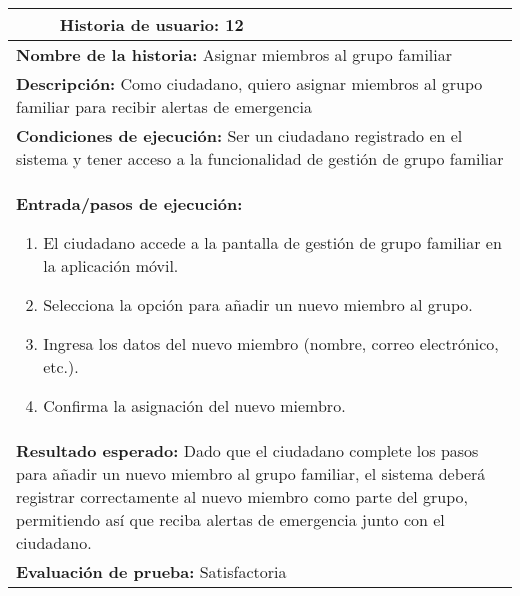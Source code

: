 \begin{longtable}{|p{6.7cm}|p{6.7cm}|}
    \hline
    \endlastfoot
    \multicolumn{1}{|p{6.7cm}|}{\textbf{Número} 12 } & \multicolumn{1}{|p{6.7cm}|}{\textbf{Historia de usuario:} 12}                                                                                                                                                                                              \\
    \hline
    \multicolumn{2}{|p{13.4cm}|}{\textbf{Nombre de la historia:} Asignar miembros al grupo familiar }                                                                                                                                                                                                             \\
    \hline
    \multicolumn{2}{|p{13.4cm}|}{\textbf{Descripción:} Como ciudadano, quiero asignar miembros al grupo familiar para recibir alertas de emergencia}                                                                                                                                                              \\
    \hline
    \multicolumn{2}{|p{13.4cm}|}{\textbf{Condiciones de ejecución:} Ser un ciudadano registrado en el sistema y tener acceso a la funcionalidad de gestión de grupo familiar}                                                                                                                                     \\
    \hline
    \multicolumn{2}{|p{13.4cm}|}{\textbf{Entrada/pasos de ejecución:}
    \begin{enumerate}[label=\arabic*.]
        \item El ciudadano accede a la pantalla de gestión de grupo familiar en la aplicación móvil.
        \item Selecciona la opción para añadir un nuevo miembro al grupo.
        \item Ingresa los datos del nuevo miembro (nombre, correo electrónico, etc.).
        \item Confirma la asignación del nuevo miembro.
    \end{enumerate}
    }                                                                                                                                                                                                                                                                                                             \\
    \hline
    \multicolumn{2}{|p{13.4cm}|}{\textbf{Resultado esperado:} Dado que el ciudadano complete los pasos para añadir un nuevo miembro al grupo familiar, el sistema deberá registrar correctamente al nuevo miembro como parte del grupo, permitiendo así que reciba alertas de emergencia junto con el ciudadano.} \\
    \hline
    \multicolumn{2}{|p{13.4cm}|}{\textbf{Evaluación de prueba:} Satisfactoria}                                                                                                                                                                                                                                    \\
    \hline
\end{longtable}

